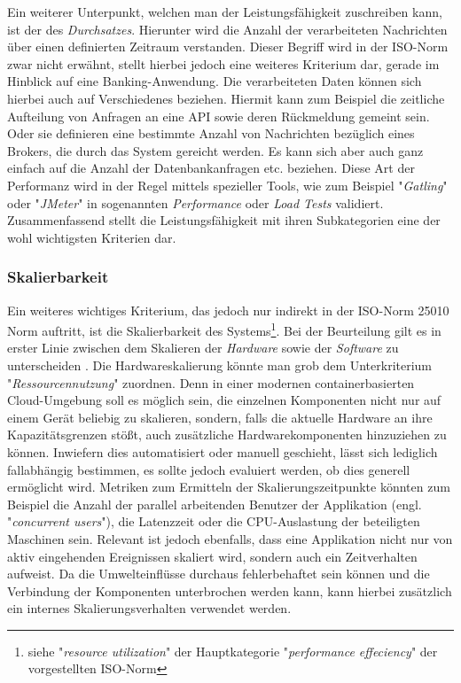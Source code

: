 Ein weiterer Unterpunkt, welchen man der Leistungsfähigkeit zuschreiben kann, ist der des \emph{Durchsatzes}. Hierunter wird die Anzahl der verarbeiteten Nachrichten über einen definierten Zeitraum verstanden. Dieser Begriff wird in der ISO-Norm zwar nicht erwähnt, stellt hierbei jedoch eine weiteres Kriterium dar, gerade im Hinblick auf eine Banking-Anwendung. Die verarbeiteten Daten können sich hierbei auch auf Verschiedenes beziehen. Hiermit kann zum Beispiel die zeitliche Aufteilung von Anfragen an eine API sowie deren Rückmeldung gemeint sein. Oder sie definieren eine bestimmte Anzahl von Nachrichten bezüglich eines Brokers, die durch das System gereicht werden. Es kann sich aber auch ganz einfach auf die Anzahl der Datenbankanfragen etc. beziehen. Diese Art der Performanz wird in der Regel mittels spezieller Tools, wie zum Beispiel "\emph{Gatling}" oder "\emph{JMeter}" in sogenannten \emph{Performance} oder \emph{Load Tests} validiert. Zusammenfassend stellt die Leistungsfähigkeit mit ihren Subkategorien eine der wohl wichtigsten Kriterien dar.


\subsubsection{Skalierbarkeit}

Ein weiteres wichtiges Kriterium, das jedoch nur indirekt in der ISO-Norm 25010 Norm auftritt, ist die Skalierbarkeit des Systems\footnote{siehe "\emph{resource utilization}" der Hauptkategorie "\emph{performance effeciency}" der vorgestellten ISO-Norm}. Bei der Beurteilung gilt es in erster Linie zwischen dem Skalieren der \emph{Hardware} sowie der \emph{Software} zu unterscheiden \cite{nfr-dotnetcurry}. Die Hardwareskalierung könnte man grob dem Unterkriterium "\emph{Ressourcennutzung}" zuordnen. Denn in einer modernen containerbasierten Cloud-Umgebung soll es möglich sein, die einzelnen Komponenten nicht nur auf einem Gerät beliebig zu skalieren, sondern, falls die aktuelle Hardware an ihre Kapazitätsgrenzen stößt, auch zusätzliche Hardwarekomponenten hinzuziehen zu können. Inwiefern dies automatisiert oder manuell geschieht, lässt sich lediglich fallabhängig bestimmen, es sollte jedoch evaluiert werden, ob dies generell ermöglicht wird. Metriken zum Ermitteln der Skalierungszeitpunkte könnten zum Beispiel die Anzahl der parallel arbeitenden Benutzer der Applikation (engl. "\emph{concurrent users}"), die Latenzzeit oder die CPU-Auslastung der beteiligten Maschinen sein. Relevant ist jedoch ebenfalls, dass eine Applikation nicht nur von aktiv eingehenden Ereignissen skaliert wird, sondern auch ein Zeitverhalten aufweist. Da die Umwelteinflüsse durchaus fehlerbehaftet sein können und die Verbindung der Komponenten unterbrochen werden kann, kann hierbei zusätzlich ein internes Skalierungsverhalten verwendet werden.

